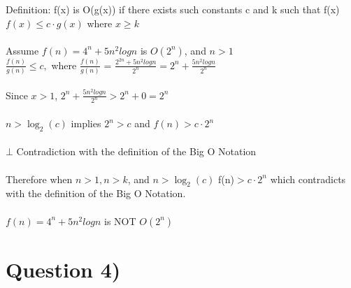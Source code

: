 \documentclass[a4paper,12pt]{article}
\newcommand\tab[1][1cm]{\hspace*{#1}}
\begin{document}
\begin{center}
\begin{tcolorbox}
    Definition: f(x) is O(g(x)) if there exists such constants c and k such that f(x) $f(x) \le c \cdot g(x)$ where $x \ge k $  \\ \\
    Assume $f(n) = 4^n +5n^2 logn $ is  $O(2^n)$, and $n>1$\\
    $\frac{f(n)}{g(n)} \le c,$ where $\frac{f(n)}{g(n)}$ = $\frac{2^{2n}+5n^2logn}{2^n} = 2^n + \frac{5n^2logn}{2^n}$\\ \\
    Since $x > 1$, \tab $2^n + \frac{5n^2logn}{2^n} > 2^n +0 = 2^n$\\ \\
    $n > \log_2(c)$ implies $2^n > c$ and $f(n) > c \cdot 2^n$ \\ \\
    $\bot$ Contradiction with the definition of the Big O Notation  \\ \\
    Therefore when $n > 1, n > k$, and $n > \log_2(c)$ f(n)$> c\cdot 2^n$ which contradicts with the definition of the Big O Notation. \\\\
    $f(n) = 4^n +5n^2 logn $ is NOT $O(2^n)$
\end{tcolorbox}
\end{center}
\noindent
\newline

\newpage

\newpage
\section*{Question 4) \hfill {}}
\tab 
\end{document}
